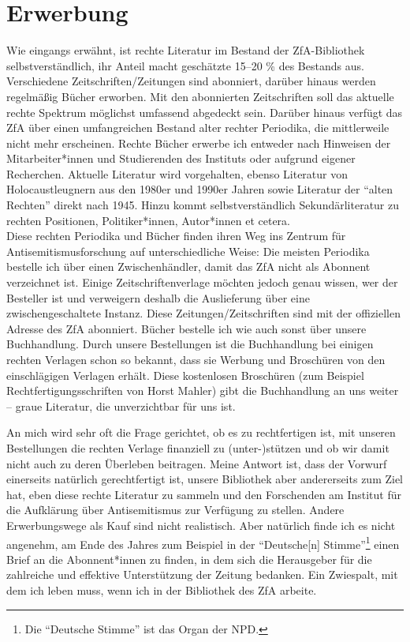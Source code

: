 \documentclass[a4paper,
fontsize=11pt,
oneside,
numbers=noperiodatend,
parskip=half-,
bibliography=totoc,
final
]{scrartcl}
\begin{document}
\hypertarget{erwerbung}{%
\section{Erwerbung}\label{erwerbung}}

Wie eingangs erwähnt, ist rechte Literatur im Bestand der ZfA-Bibliothek
selbstverständlich, ihr Anteil macht geschätzte 15--20 \% des Bestands
aus. Verschiedene Zeitschriften/Zeitungen sind abonniert, darüber hinaus
werden regelmäßig Bücher erworben. Mit den abonnierten Zeitschriften
soll das aktuelle rechte Spektrum möglichst umfassend abgedeckt sein.
Darüber hinaus verfügt das ZfA über einen umfangreichen Bestand alter
rechter Periodika, die mittlerweile nicht mehr erscheinen. Rechte Bücher
erwerbe ich entweder nach Hinweisen der Mitarbeiter*innen und
Studierenden des Instituts oder aufgrund eigener Recherchen. Aktuelle
Literatur wird vorgehalten, ebenso Literatur von Holocaustleugnern aus
den 1980er und 1990er Jahren sowie Literatur der \enquote{alten Rechten}
direkt nach 1945. Hinzu kommt selbstverständlich Sekundärliteratur zu
rechten Positionen, Politiker*innen, Autor*innen et cetera.\\
Diese rechten Periodika und Bücher finden ihren Weg ins Zentrum für
Antisemitismusforschung auf unterschiedliche Weise: Die meisten
Periodika bestelle ich über einen Zwischenhändler, damit das ZfA nicht
als Abonnent verzeichnet ist. Einige Zeitschriftenverlage möchten jedoch
genau wissen, wer der Besteller ist und verweigern deshalb die
Auslieferung über eine zwischengeschaltete Instanz. Diese
Zeitungen/Zeitschriften sind mit der offiziellen Adresse des ZfA
abonniert. Bücher bestelle ich wie auch sonst über unsere Buchhandlung.
Durch unsere Bestellungen ist die Buchhandlung bei einigen rechten
Verlagen schon so bekannt, dass sie Werbung und Broschüren von den
einschlägigen Verlagen erhält. Diese kostenlosen Broschüren (zum
Beispiel Rechtfertigungsschriften von Horst Mahler) gibt die
Buchhandlung an uns weiter -- graue Literatur, die unverzichtbar für uns
ist.

An mich wird sehr oft die Frage gerichtet, ob es zu rechtfertigen ist,
mit unseren Bestellungen die rechten Verlage finanziell zu
(unter-)stützen und ob wir damit nicht auch zu deren Überleben
beitragen. Meine Antwort ist, dass der Vorwurf einerseits natürlich
gerechtfertigt ist, unsere Bibliothek aber andererseits zum Ziel hat,
eben diese rechte Literatur zu sammeln und den Forschenden am Institut
für die Aufklärung über Antisemitismus zur Verfügung zu stellen. Andere
Erwerbungswege als Kauf sind nicht realistisch. Aber natürlich finde ich
es nicht angenehm, am Ende des Jahres zum Beispiel in der
\enquote{Deutsche{[}n{]} Stimme}\footnote{Die \enquote{Deutsche Stimme}
  ist das Organ der NPD.} einen Brief an die Abonnent*innen zu finden,
in dem sich die Herausgeber für die zahlreiche und effektive
Unterstützung der Zeitung bedanken. Ein Zwiespalt, mit dem ich leben
muss, wenn ich in der Bibliothek des ZfA arbeite.
\end{document}
